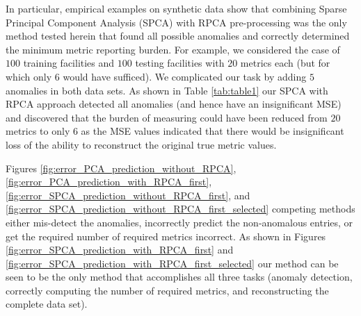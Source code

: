 \documentclass[conference]{IEEEtran}
\begin{document}
In particular, empirical examples on synthetic data show that combining Sparse Principal Component Analysis (SPCA) with RPCA pre-processing was the only method tested herein that found all possible anomalies 
and correctly determined the minimum metric reporting burden. For example, we considered the case of $100$ training facilities and $100$ testing facilities with $20$ metrics each (but for which only $6$ would have sufficed). We complicated our task by adding $5$ anomalies in both  data sets.  
As shown in Table \ref{tab:table1} our SPCA with RPCA approach detected all anomalies (and hence have an insignificant MSE) and discovered that the burden of measuring could have been reduced from $20$ metrics to only $6$ as the MSE values indicated that there would be insignificant loss of the ability to reconstruct the original true metric values.


Figures \ref{fig:error_PCA_prediction_without_RPCA}, \ref{fig:error_PCA_prediction_with_RPCA_first}, \ref{fig:error_SPCA_prediction_without_RPCA_first}, and \ref{fig:error_SPCA_prediction_without_RPCA_first_selected} competing methods either mis-detect the anomalies, incorrectly predict the non-anomalous entries, or get the required number of required metrics incorrect.
As shown in Figures \ref{fig:error_SPCA_prediction_with_RPCA_first} and \ref{fig:error_SPCA_prediction_with_RPCA_first_selected} our method can be seen to be the only method that accomplishes all three tasks (anomaly detection, correctly computing the number of required metrics, and reconstructing the complete data set).
\end{document}
